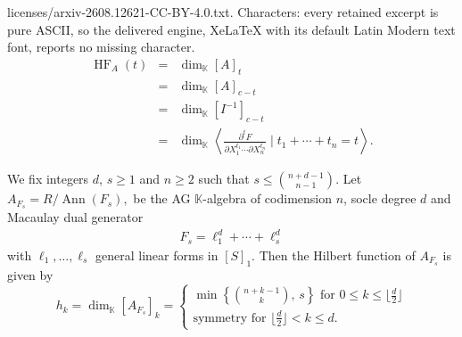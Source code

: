 \documentclass[10pt,a4paper]{amsart}
\DeclareMathOperator{\HF}{HF}
\DeclareMathOperator{\ann}{Ann}
\newcommand{\K}{\mathbb{K}}
\begin{document}
licenses/arxiv-2608.12621-CC-BY-4.0.txt. Characters: every retained excerpt is pure ASCII, so the delivered engine, XeLaTeX with its default Latin Modern text font, reports no missing character.
\begin{equation}
    \label{computingHilbertFunctionGorenstein}
\begin{array}{lcl}
    \HF_A(t) &= &\dim_{\K}[A]_t \\
    &= &\dim_{\K}[A]_{c-t} \\
    & =&\dim_{\K}[I^{-1}]_{c-t}  \\
    &= &\dim_{\K} \left\langle \frac{\partial ^{t}F}{\partial X_1^{t_1}\cdots \partial X_n^{t_n}} \mid t_1+\cdots +t_n= t
    \right\rangle .
\end{array}
\end{equation}

\begin{proposition}\label{h_vector}We fix integers $d$, $s\ge 1$ and $n\ge 2$ such that $s\le {n+d-1\choose n-1}$. Let $A_{F_{s}} = R/\ann(F_{s}),$ be the AG $\K$-algebra  of codimension $n$, socle degree $d$ and Macaulay dual generator 
\begin{eqnarray*}
F_{s}=\ell_1^d+\cdots+\ell_s^d
\end{eqnarray*}
with $\ell_1,\dots,\ell_s$ general linear forms in $[S]_1$.  
Then the Hilbert function of $A_{F_{s}}$ is given by
$$
h_k=\dim_{\mathbb K}[A_{F_{s}}]_k
=\begin{cases}\min\left\{\binom{n+k-1}{k},\, s\right\} \text{ for }  0\leq k\leq\lfloor\frac{d}{2}\rfloor \\
\text{symmetry}  \text{ for } \lfloor\frac{d}{2}\rfloor < k \leq d  .
\end{cases}
$$
\end{proposition}
\end{document}
